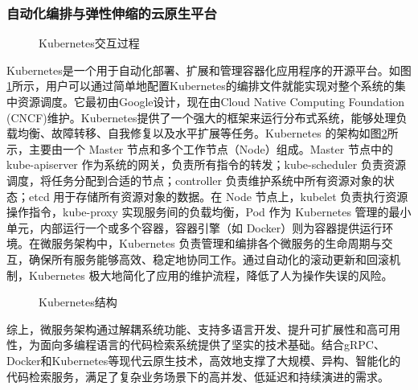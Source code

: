 \documentclass[UTF8,a4paper,12pt]{ctexart}
\numberwithin{equation}{section}
\begin{document}
\subsubsection{自动化编排与弹性伸缩的云原生平台}
\begin{figure}[H]
	\caption{Kubernetes交互过程}
	\label{k8s_m}
\end{figure}
Kubernetes是一个用于自动化部署、扩展和管理容器化应用程序的开源平台。如图\ref{k8s_m}所示，用户可以通过简单地配置Kubernetes的编排文件就能实现对整个系统的集中资源调度。它最初由Google设计，现在由Cloud Native Computing Foundation (CNCF)维护。Kubernetes提供了一个强大的框架来运行分布式系统，能够处理负载均衡、故障转移、自我修复以及水平扩展等任务。Kubernetes 的架构如图\ref{k8s_structure}所示，主要由一个 Master 节点和多个工作节点（Node）组成。Master 节点中的 kube-apiserver 作为系统的网关，负责所有指令的转发；kube-scheduler 负责资源调度，将任务分配到合适的节点；controller 负责维护系统中所有资源对象的状态；etcd 用于存储所有资源对象的数据。在 Node 节点上，kubelet 负责执行资源操作指令，kube-proxy 实现服务间的负载均衡，Pod 作为 Kubernetes 管理的最小单元，内部运行一个或多个容器，容器引擎（如 Docker）则为容器提供运行环境。在微服务架构中，Kubernetes 负责管理和编排各个微服务的生命周期与交互，确保所有服务能够高效、稳定地协同工作。通过自动化的滚动更新和回滚机制，Kubernetes 极大地简化了应用的维护流程，降低了人为操作失误的风险。\par
\begin{figure}[H]
	\caption{Kubernetes结构}
	\label{k8s_structure}
\end{figure}
综上，微服务架构通过解耦系统功能、支持多语言开发、提升可扩展性和高可用性，为面向多编程语言的代码检索系统提供了坚实的技术基础。结合gRPC、Docker和Kubernetes等现代云原生技术，高效地支撑了大规模、异构、智能化的代码检索服务，满足了复杂业务场景下的高并发、低延迟和持续演进的需求。
\end{document}
